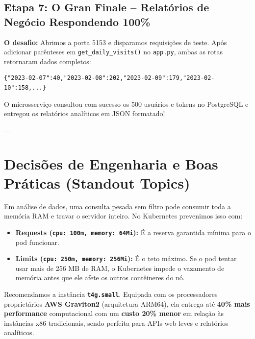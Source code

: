 \documentclass[11pt,a4paper]{article}
\begin{document}
\subsection{Etapa 7: O Gran Finale -- Relatórios de Negócio Respondendo 100\%}
\textbf{O desafio:} Abrimos a porta 5153 e disparamos requisições de teste. Após adicionar parênteses em \texttt{get\_daily\_visits()} no \texttt{app.py}, ambas as rotas retornaram dados completos:
\begin{lstlisting}
{"2023-02-07":40,"2023-02-08":202,"2023-02-09":179,"2023-02-10":158,...}
\end{lstlisting}
O microsserviço consultou com sucesso os 500 usuários e tokens no PostgreSQL e entregou os relatórios analíticos em JSON formatado!

---

\section{Decisões de Engenharia e Boas Práticas (Standout Topics)}

\begin{tcolorbox}[colback=white,colframe=tipcolor,title=\textbf{1. Por que definir Requests e Limits de CPU e Memória?},fonttitle=\bfseries]
Em análise de dados, uma consulta pesada sem filtro pode consumir toda a memória RAM e travar o servidor inteiro. No Kubernetes prevenimos isso com:
\begin{itemize}
    \item \textbf{Requests (\texttt{cpu: 100m, memory: 64Mi}):} É a reserva garantida mínima para o pod funcionar.
    \item \textbf{Limits (\texttt{cpu: 250m, memory: 256Mi}):} É o teto máximo. Se o pod tentar usar mais de 256 MB de RAM, o Kubernetes impede o vazamento de memória antes que ele afete os outros contêineres do nó.
\end{itemize}
\end{tcolorbox}

\begin{tcolorbox}[colback=white,colframe=awsnavy,title=\textbf{2. Escolha da Instância EC2: Por que a família Graviton (t4g)?},fonttitle=\bfseries]
Recomendamos a instância \textbf{\texttt{t4g.small}}. Equipada com os processadores proprietários \textbf{AWS Graviton2} (arquitetura ARM64), ela entrega até \textbf{40\% mais performance} computacional com um \textbf{custo 20\% menor} em relação às instâncias x86 tradicionais, sendo perfeita para APIs web leves e relatórios analíticos.
\end{tcolorbox}
\end{document}
